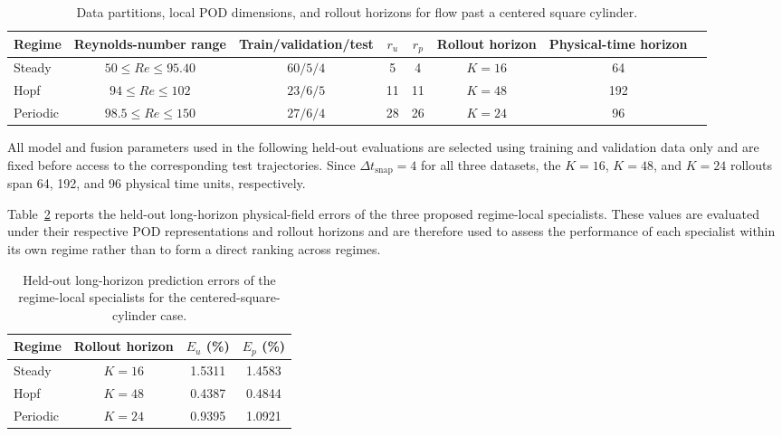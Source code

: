 \begin{table}[htbp]
\centering
\caption{Data partitions, local POD dimensions, and rollout horizons for flow past a centered square cylinder.}
\label{tab:centered_square_data_contracts}

\scriptsize
\begin{adjustbox}{max width=\textwidth}
\begin{tabular}{@{}lccccccc@{}}
\toprule
Regime
& Reynolds-number range
& Train/validation/test
& $r_u$
& $r_p$
& Rollout horizon
& Physical-time horizon \\
\midrule

Steady
& $50\le Re\le95.40$
& $60/5/4$
& 5
& 4
& $K=16$
& 64 \\

Hopf
& $94\le Re\le102$
& $23/6/5$
& 11
& 11
& $K=48$
& 192 \\

Periodic
& $98.5\le Re\le150$
& $27/6/4$
& 28
& 26
& $K=24$
& 96 \\

\bottomrule
\end{tabular}
\end{adjustbox}
\end{table}

All model and fusion parameters used in the following held-out evaluations
are selected using training and validation data only and are fixed before
access to the corresponding test trajectories. Since
$\Delta t_{\mathrm{snap}}=4$ for all three datasets, the $K=16$, $K=48$,
and $K=24$ rollouts span 64, 192, and 96 physical time units,
respectively.

Table~\ref{tab:centered_square_specialist_aggregate} reports the
held-out long-horizon physical-field errors of the three proposed
regime-local specialists. These values are evaluated under their respective
POD representations and rollout horizons and are therefore used to assess
the performance of each specialist within its own regime rather than to form
a direct ranking across regimes.

\begin{table}[htbp]
\centering
\caption{Held-out long-horizon prediction errors of the regime-local
specialists for the centered-square-cylinder case.}
\vspace{0.3 cm}
\label{tab:centered_square_specialist_aggregate}

\small
\renewcommand{\arraystretch}{1.15}
\setlength{\tabcolsep}{12pt}

\begin{tabular}{@{}lccc@{}}
\toprule
Regime
& Rollout horizon
& $E_u$ (\%)
& $E_p$ (\%) \\
\midrule
Steady
& $K=16$
& 1.5311
& 1.4583 \\

Hopf
& $K=48$
& 0.4387
& 0.4844 \\

Periodic
& $K=24$
& 0.9395
& 1.0921 \\
\bottomrule
\end{tabular}
\end{table}

